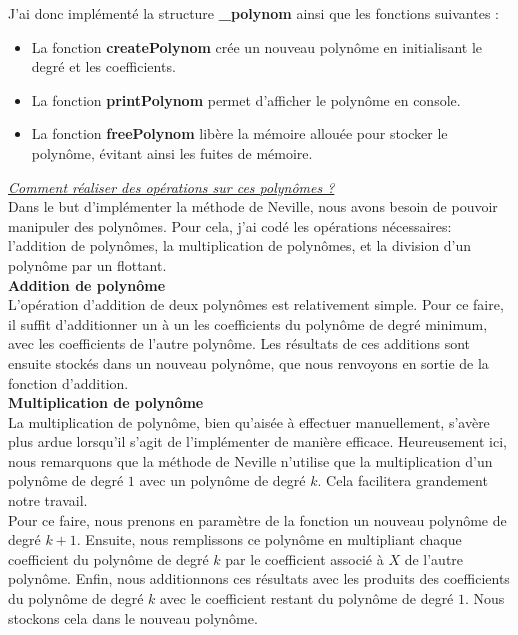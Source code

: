 J'ai donc implémenté la structure \textbf{\_polynom} ainsi que les fonctions suivantes :\vspace{2pt}\\
\begin{itemize}
    \item La fonction \textbf{createPolynom} crée un nouveau polynôme en initialisant le degré et les coefficients.
    \item La fonction \textbf{printPolynom} permet d'afficher le polynôme en console.
    \item La fonction \textbf{freePolynom} libère la mémoire allouée pour stocker le polynôme, évitant ainsi les fuites de mémoire.\\
\end{itemize}
\underline{\textit{Comment réaliser des opérations sur ces polynômes ?}}\vspace{4pt}\\
Dans le but d'implémenter la méthode de Neville, nous avons besoin de pouvoir manipuler des polynômes. Pour cela, j'ai codé les opérations nécessaires: l'addition de polynômes, la multiplication de polynômes, et la division d'un polynôme par un flottant.\vspace{4pt}\\
\textbf{Addition de polynôme}\\
L'opération d'addition de deux polynômes est relativement simple. Pour ce faire, il suffit d'additionner un à un les coefficients du polynôme de degré minimum, avec les coefficients de l'autre polynôme. Les résultats de ces additions sont ensuite stockés dans un nouveau polynôme, que nous renvoyons en sortie de la fonction d'addition.\vspace{4pt}\\
\textbf{Multiplication de polynôme}\\
La multiplication de polynôme, bien qu'aisée à effectuer manuellement, s'avère plus ardue lorsqu'il s'agit de l'implémenter de manière efficace. Heureusement ici, nous remarquons que la méthode de Neville n'utilise que la multiplication d'un polynôme de degré $1$ avec un polynôme de degré $k$. Cela facilitera grandement notre travail.\\
Pour ce faire, nous prenons en paramètre de la fonction un nouveau polynôme de degré $k+1$. Ensuite, nous remplissons ce polynôme en multipliant chaque coefficient du polynôme de degré $k$ par le coefficient associé à $X$ de l'autre polynôme. Enfin, nous additionnons ces résultats avec les produits des coefficients du polynôme de degré $k$ avec le coefficient restant du polynôme de degré $1$. Nous stockons cela dans le nouveau polynôme.\vspace{2pt}\\
